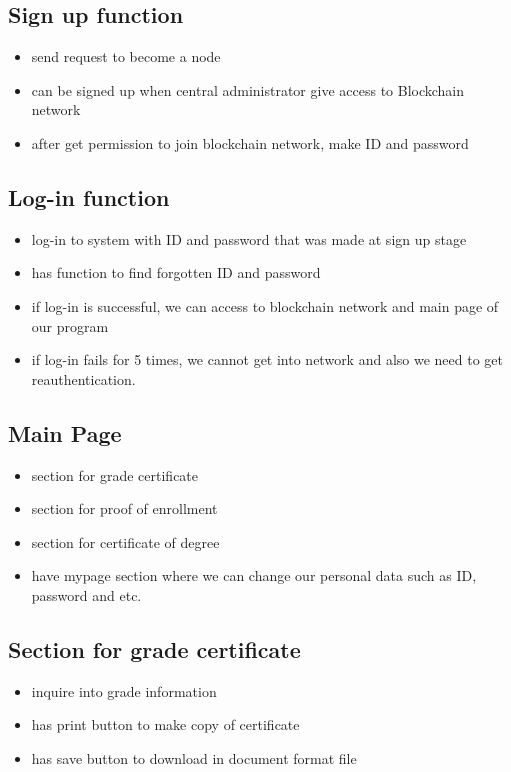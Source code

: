 \documentclass[conference]{IEEEtran}
\begin{document}
\subsection{Sign up function}
\begin{itemize}
\item send request to become a node
\item can be signed up when central administrator give access to Blockchain network
\item after get permission to join blockchain network, make ID and password
\end{itemize}

\subsection{Log-in function}
\begin{itemize}
\item log-in to system with ID and password that was made at sign up stage
\item has function to find forgotten ID and password
\item if log-in is successful, we can access to blockchain network and main page of our program
\item if log-in fails for 5 times, we cannot get into network and also we need to get reauthentication.
\end{itemize}

\subsection{Main Page}
\begin{itemize}
\item section for grade certificate
\item section for proof of enrollment
\item section for certificate of degree
\item have mypage section where we can change our personal data such as ID, password and etc.
\end{itemize}

\subsection{Section for grade certificate}
\begin{itemize}
\item inquire into grade information
\item has print button to make copy of certificate
\item has save button to download in document format file
\end{itemize}
\end{document}

